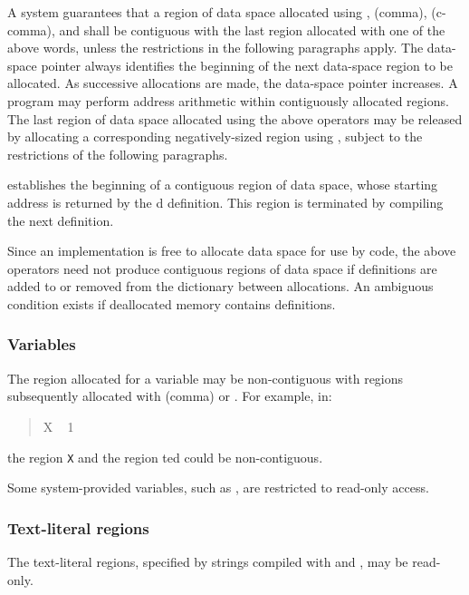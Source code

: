 A system guarantees that a region of data space allocated using
, \word{,} (comma),  (c-comma), and
 shall be contiguous with the last region allocated
with one of the above words, unless the restrictions in the
following paragraphs apply. The data-space pointer 
always identifies the beginning of the next data-space region to be
allocated. As successive allocations are made, the data-space
pointer increases. A program may perform address arithmetic within
contiguously allocated regions. The last region of data space
allocated using the above operators may be released by allocating a
corresponding negatively-sized region using , subject
to the restrictions of the following paragraphs.

 establishes the beginning of a contiguous region of
data space, whose starting address is returned by the d
definition. This region is terminated by compiling the next
definition.

Since an implementation is free to allocate data space for use by
code, the above operators need not produce contiguous regions of
data space if definitions are added to or removed from the
dictionary between allocations. An ambiguous condition exists if
deallocated memory contains definitions.


\subsubsection{Variables} %
\label{usage:var}

The region allocated for a variable may be non-contiguous with
regions subsequently allocated with \linebreak \word{,} (comma) or
. For example, in:
\begin{quote}
	 X ~ 1  
\end{quote}
the region \texttt{X} and the region ted could be
non-contiguous.

Some system-provided variables, such as , are
restricted to read-only access.


\subsubsection{Text-literal regions} %
\label{usage:"literal}

The text-literal regions, specified by strings compiled with
 and , may be read-only.

